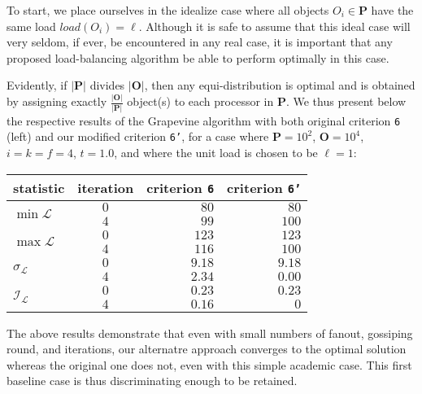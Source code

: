 To start, we place ourselves in the idealize case where all objects
$O_i\in\mathbf{P}$ have the same load $load(O_i)=\ell$.
Although it is safe to assume that this ideal case will very seldom,
if ever, be encountered in any real case, it is important that any
proposed load-balancing algorithm be able to perform optimally in this
case.

Evidently, if $\vert\mathbf{P}\vert$ divides $\vert\mathbf{O}\vert$,
then any  equi-distribution is optimal and is obtained by assigning
exactly $\tfrac{\vert\mathbf{O}\vert}{\vert\mathbf{P}\vert}$ object(s)
to each processor in $\mathbf{P}$.
We thus present below the respective results of the
Grapevine algorithm with both original criterion \texttt{6} (left) and
our modified criterion \texttt{6'}, for a case where
$\mathbf{P}=10^2$, $\mathbf{O}=10^4$, $i=k=f=4$, $t=1.0$, and where
the unit load is chosen to be $\ell=1$:
\begin{center}
\begin{tabular}{lcrr}
\hline
statistic & iteration & criterion \texttt{6} & criterion \texttt{6'} \\
\hline\hline
\multirow{2}{*}{$\min{\mathcal{L}}$}
&$0$ &$80$   &$80$   \\ &$4$ &$99$    &$100$ \\\hline
\multirow{2}{*}{$\max{\mathcal{L}}$}
&$0$ &$123$  &$123$  \\ &$4$ &$116$   &$100$ \\\hline
\multirow{2}{*}{$\sigma_{\mathcal{L}}$}
&$0$ &$9.18$ &$9.18$ \\ &$4$ &$2.34$  &$0.00$ \\\hline
\multirow{2}{*}{$\mathcal{I}_\mathcal{L}$}
&$0$ &$0.23$ &$0.23$ \\ &$4$ &$0.16$  &$0$ \\\hline
\end{tabular}
\end{center}
The above results demonstrate that even with small numbers of fanout,
gossiping round, and iterations, our alternatre approach converges to
the optimal solution whereas the original one does not, even with this
simple academic case. This first baseline case is thus discriminating
enough to be retained.

